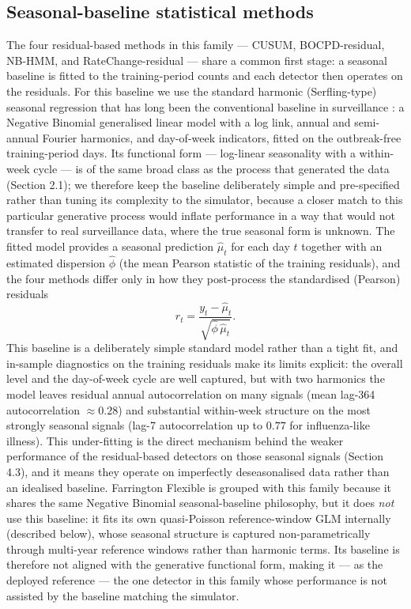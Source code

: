 \documentclass[11pt]{article}
\begin{document}
\subsection{Seasonal-baseline statistical methods}

The four residual-based methods in this family --- CUSUM, BOCPD-residual, NB-HMM, and RateChange-residual --- share a common first stage: a seasonal baseline is fitted to the training-period counts and each detector then operates on the residuals. For this baseline we use the standard harmonic (Serfling-type) seasonal regression that has long been the conventional baseline in surveillance \citep{serfling1963, unkel2012}: a Negative Binomial generalised linear model with a log link, annual and semi-annual Fourier harmonics, and day-of-week indicators, fitted on the outbreak-free training-period days. Its functional form --- log-linear seasonality with a within-week cycle --- is of the same broad class as the process that generated the data (Section 2.1); we therefore keep the baseline deliberately simple and pre-specified rather than tuning its complexity to the simulator, because a closer match to this particular generative process would inflate performance in a way that would not transfer to real surveillance data, where the true seasonal form is unknown. The fitted model provides a seasonal prediction $\hat{\mu}_t$ for each day $t$ together with an estimated dispersion $\hat{\phi}$ (the mean Pearson statistic of the training residuals), and the four methods differ only in how they post-process the standardised (Pearson) residuals
\[
r_t = \frac{y_t - \hat{\mu}_t}{\sqrt{\hat{\phi}\,\hat{\mu}_t}}.
\]
This baseline is a deliberately simple standard model rather than a tight fit, and in-sample diagnostics on the training residuals make its limits explicit: the overall level and the day-of-week cycle are well captured, but with two harmonics the model leaves residual annual autocorrelation on many signals (mean lag-364 autocorrelation $\approx 0.28$) and substantial within-week structure on the most strongly seasonal signals (lag-7 autocorrelation up to $0.77$ for influenza-like illness). This under-fitting is the direct mechanism behind the weaker performance of the residual-based detectors on those seasonal signals (Section 4.3), and it means they operate on imperfectly deseasonalised data rather than an idealised baseline.
Farrington Flexible is grouped with this family because it shares the same Negative Binomial seasonal-baseline philosophy, but it does \emph{not} use this baseline: it fits its own quasi-Poisson reference-window GLM internally (described below), whose seasonal structure is captured non-parametrically through multi-year reference windows rather than harmonic terms. Its baseline is therefore not aligned with the generative functional form, making it --- as the deployed reference --- the one detector in this family whose performance is not assisted by the baseline matching the simulator.
\end{document}
